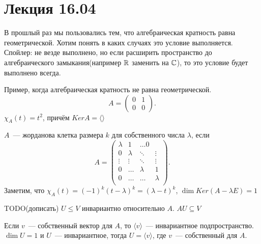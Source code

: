 \section*{Лекция 16.04}
\begin{motivation}
    В прошлый раз мы пользовались тем, что алгебраическая кратность равна геометрической. Хотим понять в каких случаях это условие
    выполняется. Спойлер: не везде выполнено, но если расширить пространство до алгебраического замыкания(например $\mathbb{R}$ заменить на $\mathbb{C}$),
    то это условие будет выполнено всегда.
\end{motivation}
\begin{example}
    Пример, когда алгебраическая кратность не равна геометрической.
     \[
         A = 
         \begin{pmatrix}
             0 & 1\\
             0 & 0
         \end{pmatrix}
    .\] 
    $\chi_A(t) = t^2$, причём $Ker A = \langle\rangle$
\end{example}
\begin{definition}
    $A$~--- жорданова клетка размера $k$ для собственного числа $\lambda$, если
     \[
         A = 
         \begin{pmatrix}
             \lambda & 1 & \dots 0\\
             0 & \lambda & \ddots & \vdots\\
             \vdots&\vdots&\ddots&\vdots\\
             0 & \dots & \lambda & 1\\
             0 & \dots & \dots & \lambda\\
         \end{pmatrix}
    .\] 
    Заметим, что $\chi_A(t) = (-1)^k(t-\lambda)^k= (\lambda-t)^k$,  $\dim Ker(A - \lambda E) = 1$
\end{definition}
\begin{definition}
    TODO(дописать)
    $U\le V$ инвариантно относительно $A$. $AU \subseteq V$
\end{definition}
\begin{remark}
    Если $v$~--- собственный вектор для $A$, то $\langle v \rangle$~--- инвариантное подпространство.
    $\dim U = 1$ и $U$~--- инвариантное, тогда $U = \langle v\rangle$, где  $v$~--- собственный для $A$.
\end{remark}
